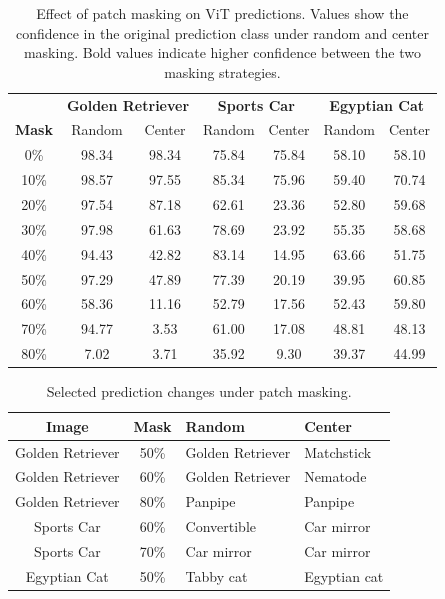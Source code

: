 \documentclass{article}
\begin{document}
\begin{table}[t]
    \centering
    \caption{Effect of patch masking on ViT predictions. Values show the
    confidence in the original prediction class under random and center
    masking. Bold values indicate higher confidence between the two
    masking strategies.}
    \label{tab:masking_results}
    \small
    \begin{tabular}{c|cc|cc|cc}
        \toprule
        & \multicolumn{2}{c|}{\textbf{Golden Retriever}}
        & \multicolumn{2}{c|}{\textbf{Sports Car}}
        & \multicolumn{2}{c}{\textbf{Egyptian Cat}} \\
        \textbf{Mask} & Random & Center & Random & Center & Random & Center \\
        \midrule
        0\%  & 98.34 & 98.34 & 75.84 & 75.84 & 58.10 & 58.10 \\
        10\% & 98.57 & 97.55 & 85.34 & 75.96 & 59.40 & 70.74 \\
        20\% & 97.54 & 87.18 & 62.61 & 23.36 & 52.80 & 59.68 \\
        30\% & 97.98 & 61.63 & 78.69 & 23.92 & 55.35 & 58.68 \\
        40\% & 94.43 & 42.82 & 83.14 & 14.95 & 63.66 & 51.75 \\
        50\% & 97.29 & 47.89 & 77.39 & 20.19 & 39.95 & 60.85 \\
        60\% & 58.36 & 11.16 & 52.79 & 17.56 & 52.43 & 59.80 \\
        70\% & 94.77 & 3.53  & 61.00 & 17.08 & 48.81 & 48.13 \\
        80\% & 7.02  & 3.71  & 35.92 & 9.30  & 39.37 & 44.99 \\
        \bottomrule
    \end{tabular}
\end{table}

\begin{table}[ht]
    \centering
    \caption{Selected prediction changes under patch masking.}
    \label{tab:masking_predictions}
    \small
    \begin{tabular}{ccll}
        \toprule
        \textbf{Image} & \textbf{Mask} & \textbf{Random} & \textbf{Center} \\
        \midrule
        Golden Retriever & 50\% &
        Golden Retriever &
        Matchstick \\
        
        Golden Retriever & 60\% &
        Golden Retriever &
        Nematode \\
        
        Golden Retriever & 80\% &
        Panpipe &
        Panpipe \\
        
        Sports Car & 60\% &
        Convertible &
        Car mirror \\
        
        Sports Car & 70\% &
        Car mirror &
        Car mirror \\
        
        Egyptian Cat & 50\% &
        Tabby cat &
        Egyptian cat \\
        \bottomrule
    \end{tabular}
\end{table}
\end{document}
